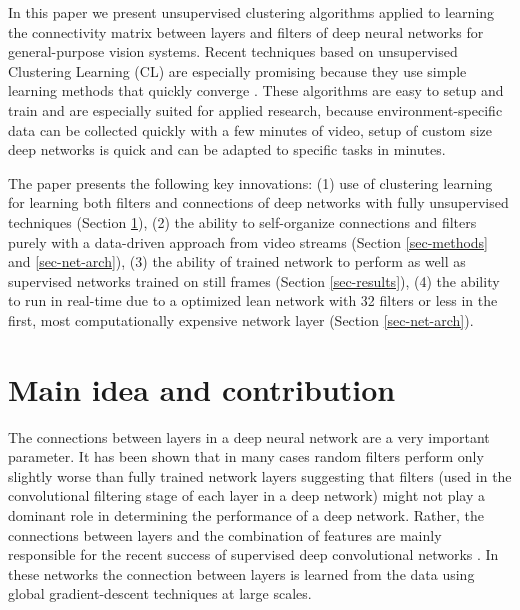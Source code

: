 \documentclass{article} %
\begin{document}
In this paper we present unsupervised clustering algorithms applied to learning the connectivity matrix between layers and filters of deep neural networks for general-purpose vision systems. Recent techniques based on unsupervised Clustering Learning (CL) are especially promising because they use simple learning methods that quickly converge \cite{culurciello2013clustering, coates_analysis_2011}. 
These algorithms are easy to setup and train and are especially suited for applied research, because environment-specific data can be collected quickly with a few minutes of video, setup of custom size deep networks is quick and can be adapted to specific tasks in minutes.


The paper presents the following key innovations: (1) use of clustering learning for learning both filters and connections of deep networks with fully unsupervised techniques (Section \ref{sec-main}), (2) the ability to self-organize connections and filters purely with a data-driven approach from video streams (Section \ref{sec-methods} and  \ref{sec-net-arch}), (3) the ability of trained network to perform as well as supervised networks trained on still frames (Section \ref{sec-results}), (4) the ability to run in real-time due to a optimized lean network with 32 filters or less in the first, most computationally expensive network layer (Section \ref{sec-net-arch}). 



\section{Main idea and contribution}
\label{sec-main}

The connections between layers in a deep neural network are a very important parameter. It has been shown that in many cases random filters perform only slightly worse than fully trained network layers \cite{saxe2011random} suggesting that filters (used in the convolutional filtering stage of each layer in a deep network) might not play a dominant role in determining the performance of a deep network.
Rather, the connections between layers and the combination of features are mainly responsible for the recent success of supervised deep convolutional networks \cite{krizhevsky_imagenet_2012}. In these networks the connection between layers is learned from the data using global gradient-descent techniques at large scales.
 
\end{document}
